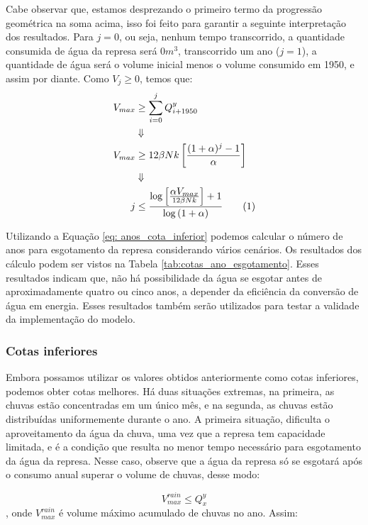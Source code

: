 \documentclass{article}
\newcommand\numberthis{\addtocounter{equation}{1}\tag{\theequation}}
\begin{document}
Cabe observar que, estamos desprezando o primeiro termo da progressão geométrica na soma acima, isso foi feito para garantir a seguinte interpretação dos resultados. Para $j = 0$, ou seja, nenhum tempo transcorrido, a quantidade consumida de água da represa será $0 m^3$, transcorrido um ano ($j = 1$), a quantidade de água será o volume inicial menos o volume consumido em 1950, e assim por diante. Como $V_j \geq 0$, temos que:
\begin{align*}
    V_{max} &\geq \sum_{i=0}^{j} Q_{i + 1950}^y \\
    &\Downarrow\\ 
    V_{max} &\geq 12\beta Nk \left[ \frac{(1 + \alpha)^{j} - 1}{\alpha}\right] \\
    &\Downarrow \\
    j &\leq \frac{\log{\left[ \frac{\displaystyle \alpha V_{max}}{12\beta Nk}\right]} + 1}{\displaystyle \log{(1 + \alpha)}} \numberthis \label{eq: anos_cota_inferior}
\end{align*}

Utilizando a Equação \ref{eq: anos_cota_inferior} podemos calcular o número de anos para esgotamento da represa considerando vários cenários. Os resultados dos cálculo podem ser vistos na Tabela \ref{tab:cotas_ano_esgotamento}. Esses resultados indicam que, não há possibilidade da água se esgotar antes de aproximadamente quatro ou cinco anos, a depender da eficiência da conversão de água em energia. Esses resultados também serão utilizados para testar a validade da implementação do modelo. 

\subsubsection*{Cotas inferiores}

Embora possamos utilizar os valores obtidos anteriormente como cotas inferiores, podemos obter cotas melhores. Há duas situações extremas, na primeira, as chuvas estão concentradas em um único mês, e na segunda, as chuvas estão distribuídas uniformemente durante o ano. A primeira situação, dificulta o aproveitamento da água da chuva, uma vez que a represa tem capacidade limitada, e é a condição que resulta no menor tempo necessário para esgotamento da água da represa. Nesse caso, observe que a água da represa só se esgotará após o consumo anual superar o volume de chuvas, desse modo:

\begin{equation}
    V_{max}^{rain} \leq Q_x^y
\end{equation},
onde $V_{max}^{rain}$ é volume máximo acumulado de chuvas no ano. Assim:
\end{document}
